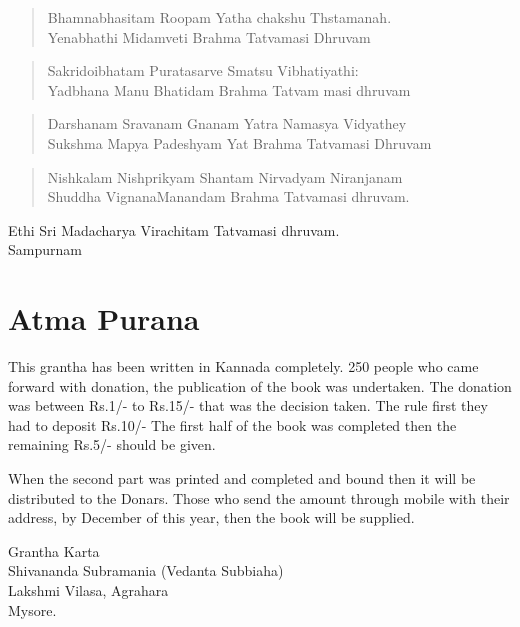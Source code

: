 \begin{verse}
 Bhamnabhasitam Roopam Yatha chakshu Thstamanah.\\
 Yenabhathi Midamveti Brahma Tatvamasi Dhruvam
\end{verse}

\begin{verse}
 Sakridoibhatam Puratasarve Smatsu Vibhatiyathi:\\
 Yadbhana Manu Bhatidam Brahma Tatvam masi dhruvam
\end{verse}

\begin{verse}
 Darshanam Sravanam Gnanam Yatra Namasya Vidyathey\\
 Sukshma Mapya Padeshyam Yat Brahma Tatvamasi \break Dhruvam
\end{verse}

\begin{verse}
 Nishkalam Nishprikyam Shantam Nirvadyam Niranjanam\\
 Shuddha VignanaManandam Brahma Tatvamasi dhruvam.
\end{verse}

\begin{center}
Ethi Sri Madacharya Virachitam Tatvamasi dhruvam. \\ Sampurnam
\end{center}

\chapter*{Atma Purana}

This grantha has been written in Kannada completely. 250 people who came forward with donation, the publication of the book was undertaken. The donation was between Rs.1/- to Rs.15/- that was the decision taken. The rule first they had to deposit Rs.10/- The first half of the book was completed then the remaining Rs.5/- should be given.

When the second part was printed and completed and bound then it will be distributed to the Donars. Those who send the amount through mobile with their address, by December of this year, then the book will be supplied.

\begin{center}
Grantha Karta\\ Shivananda Subramania (Vedanta Subbiaha)\\ Lakshmi Vilasa, Agrahara\\ Mysore.
\end{center}

